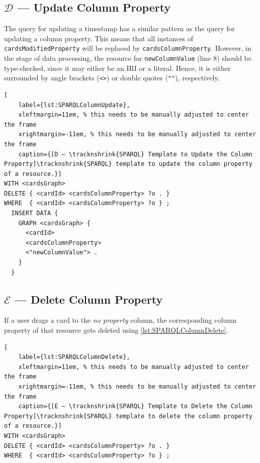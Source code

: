 \newpage

\subsection[D — Update Column Property]{\(\mathcal{D}\) — Update Column Property}\label{ssec:QS-D}

The query for updating a timestamp has a similar pattern as the query for updating a column property. This means that all instances of \texttt{cardsModifiedProperty} will be replaced by \texttt{cardsColumnProperty}. However, in the stage of data processing, the resource for \texttt{newColumnValue} (line 8) should be type-checked, since it may either be an \acrshort*{IRI} or a literal. Hence, it is either surrounded by angle brackets (\texttt{<>}) or double quotes (\texttt{""}), respectively.


\begin{spacing}{0.9}
    \lstset{language=SPARQL,escapechar=|}
    \begin{lstlisting}[
    label={lst:SPARQLColumnUpdate},
    xleftmargin=11em, % this needs to be manually adjusted to center the frame
    xrightmargin=-11em, % this needs to be manually adjusted to center the frame
    caption={[D — \tracknshrink{SPARQL} Template to Update the Column Property]\tracknshrink{SPARQL} template to update the column property of a resource.}]
WITH <cardsGraph>
DELETE { <cardId> <cardsColumnProperty> ?o . }
WHERE  { <cardId> <cardsColumnProperty> ?o } ;
  INSERT DATA {
    GRAPH <cardsGraph> {
      <cardId>
      <cardsColumnProperty>
      <"newColumnValue"> .
    }
  }
\end{lstlisting}
\end{spacing}


\vspace*{-1.20em}


\subsection[E — Delete Column Property]{\(\mathcal{E}\) — Delete Column Property}\label{ssec:QS-E}

If a user drags a card to the \textit{no property} column, the corresponding column property of that resource gets deleted using \autoref{lst:SPARQLColumnDelete}.

\begin{spacing}{0.9}
    \lstset{language=SPARQL,escapechar=|}
    \begin{lstlisting}[
    label={lst:SPARQLColumnDelete},
    xleftmargin=11em, % this needs to be manually adjusted to center the frame
    xrightmargin=-11em, % this needs to be manually adjusted to center the frame
    caption={[E — \tracknshrink{SPARQL} Template to Delete the Column Property]\tracknshrink{SPARQL} template to delete the column property of a resource.}]
WITH <cardsGraph>
DELETE { <cardId> <cardsColumnProperty> ?o . }
WHERE  { <cardId> <cardsColumnProperty> ?o } ;
\end{lstlisting}
\end{spacing}

\vspace*{-1.20em}
